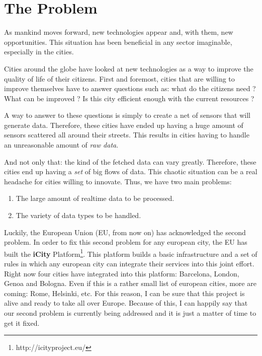 
\section{The Problem}
\label{sec:problem}

As mankind moves forward, new technologies appear and, with them, new
opportunities. This situation has been beneficial in any sector imaginable,
especially in the cities.

Cities around the globe have looked at new technologies as a way to improve the
quality of life of their citizens. First and foremost, cities that are willing
to improve themselves have to answer questions such as: what do the citizens
need ? What can be improved ? Is this city efficient enough with the current
resources ?

A way to answer to these questions is simply to create a net of sensors that
will generate data. Therefore, these cities have ended up having a huge amount
of sensors scattered all around their streets. This results in cities having to
handle an unreasonable amount of {\it raw data}.

And not only that: the kind of the fetched data can vary greatly. Therefore,
these cities end up having a {\it set} of big flows of data. This chaotic
situation can be a real headache for cities willing to innovate. Thus, we have
two main problems:

\begin{enumerate}
  \itemsep0em
  \item The large amount of realtime data to be processed.
  \item The variety of data types to be handled.
\end{enumerate}

Luckily, the European Union (EU, from now on) has acknowledged the second
problem. In order to fix this second problem for any european city, the EU has
built the {\bf iCity} Platform\footnote{http://icityproject.eu/}. This platform
builds a basic infrastructure and a set of rules in which any european city can
integrate their services into this joint effort. Right now four cities have
integrated into this platform: Barcelona, London, Genoa and Bologna. Even if
this is a rather small list of european cities, more are coming:
Rome, Helsinki, etc. For this reason, I can be sure that this project is alive
and ready to take all over Europe. Because of this, I can happily say that our
second problem is currently being addressed and it is just a matter of time to
get it fixed.

